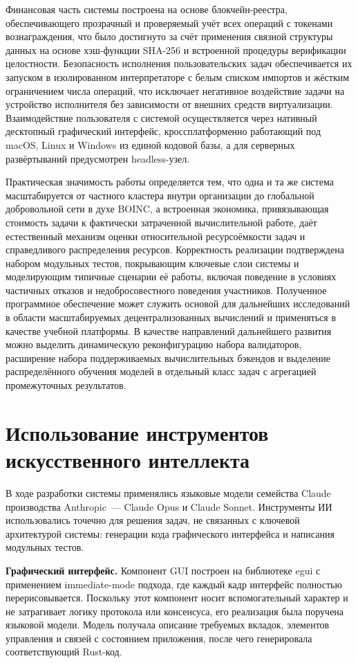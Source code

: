 \documentclass[a4paper,11pt]{extarticle}
\begin{document}
Финансовая часть системы построена на основе блокчейн-реестра, обеспечивающего
прозрачный и проверяемый учёт всех операций с токенами вознаграждения, что
было достигнуто за счёт применения связной структуры данных на основе
хэш-функции SHA-256 и встроенной процедуры верификации целостности.
Безопасность исполнения пользовательских задач обеспечивается их запуском в
изолированном интерпретаторе с белым списком импортов и жёстким ограничением
числа операций, что исключает негативное воздействие задачи на устройство
исполнителя без зависимости от внешних средств виртуализации. Взаимодействие
пользователя с системой осуществляется через нативный десктопный графический
интерфейс, кроссплатформенно работающий под macOS, Linux и Windows из единой
кодовой базы, а для серверных развёртываний предусмотрен headless-узел.

Практическая значимость работы определяется тем, что одна и та же система
масштабируется от частного кластера внутри организации до глобальной
добровольной сети в духе BOINC, а встроенная экономика, привязывающая стоимость
задачи к фактически затраченной вычислительной работе, даёт естественный
механизм оценки относительной ресурсоёмкости задач и справедливого
распределения ресурсов. Корректность реализации подтверждена набором модульных
тестов, покрывающим ключевые слои системы и моделирующим типичные сценарии её
работы, включая поведение в условиях частичных отказов и недобросовестного
поведения участников. Полученное программное обеспечение может служить основой
для дальнейших исследований в области масштабируемых децентрализованных
вычислений и применяться в качестве учебной платформы. В качестве направлений
дальнейшего развития можно выделить динамическую реконфигурацию набора
валидаторов, расширение набора поддерживаемых вычислительных бэкендов и
выделение распределённого обучения моделей в отдельный класс задач с
агрегацией промежуточных результатов.

\section{Использование инструментов искусственного интеллекта}

В ходе разработки системы применялись языковые модели семейства Claude
производства Anthropic~--- Claude Opus и Claude Sonnet. Инструменты ИИ
использовались точечно для решения задач, не связанных с ключевой архитектурой
системы: генерации кода графического интерфейса и написания модульных тестов.

\textbf{Графический интерфейс.}
Компонент GUI построен на библиотеке egui с применением immediate-mode подхода,
где каждый кадр интерфейс полностью перерисовывается. Поскольку этот компонент
носит вспомогательный характер и не затрагивает логику протокола или
консенсуса, его реализация была поручена языковой модели. Модель получала
описание требуемых вкладок, элементов управления и связей с состоянием
приложения, после чего генерировала соответствующий Rust-код.
\end{document}
